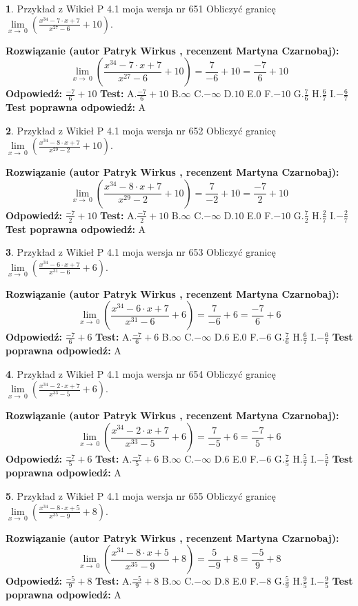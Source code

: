 \documentclass[12pt, a4paper]{article}
\theoremstyle{definition} %
\newtheorem{zad}{}
\newcommand{\zadStart}[1]{\begin{zad}#1\newline}
\newcommand{\zadStop}{\end{zad}}
\newcommand{\rozwStart}[2]{\noindent \textbf{Rozwiązanie (autor #1 , recenzent #2): }\newline}
\newcommand{\rozwStop}{\newline}
\newcommand{\odpStart}{\noindent \textbf{Odpowiedź:}\newline}
\newcommand{\odpStop}{\newline}
\newcommand{\testStart}{\noindent \textbf{Test:}\newline}
\newcommand{\testStop}{\newline}
\newcommand{\kluczStart}{\noindent \textbf{Test poprawna odpowiedź:}\newline}
\newcommand{\kluczStop}{\newline}
\begin{document}
\zadStart{Przykład z Wikieł P 4.1 moja wersja nr 651}
Obliczyć granicę $\lim\limits_{x\to\ 0}(\frac{x^{34}-7 \cdot x +7}{x^{27}-6}+10)$.
\zadStop
\rozwStart{Patryk Wirkus}{Martyna Czarnobaj}
$$\lim\limits_{x\to\ 0}(\frac{x^{34}-7 \cdot x +7}{x^{27}-6}+10)=\frac{7}{-6}+10=\frac{-7}{6}+10$$
\rozwStop
\odpStart
$\frac{-7}{6}+10$
\odpStop
\testStart
A.$\frac{-7}{6}+10$
B.$\infty$
C.$-\infty$
D.$10$
E.$0$
F.$-10$
G.$\frac{7}{6}$
H.$\frac{6}{7}$
I.$-\frac{6}{7}$
\testStop
\kluczStart
A
\kluczStop



\zadStart{Przykład z Wikieł P 4.1 moja wersja nr 652}
Obliczyć granicę $\lim\limits_{x\to\ 0}(\frac{x^{34}-8 \cdot x +7}{x^{29}-2}+10)$.
\zadStop
\rozwStart{Patryk Wirkus}{Martyna Czarnobaj}
$$\lim\limits_{x\to\ 0}(\frac{x^{34}-8 \cdot x +7}{x^{29}-2}+10)=\frac{7}{-2}+10=\frac{-7}{2}+10$$
\rozwStop
\odpStart
$\frac{-7}{2}+10$
\odpStop
\testStart
A.$\frac{-7}{2}+10$
B.$\infty$
C.$-\infty$
D.$10$
E.$0$
F.$-10$
G.$\frac{7}{2}$
H.$\frac{2}{7}$
I.$-\frac{2}{7}$
\testStop
\kluczStart
A
\kluczStop



\zadStart{Przykład z Wikieł P 4.1 moja wersja nr 653}
Obliczyć granicę $\lim\limits_{x\to\ 0}(\frac{x^{34}-6 \cdot x +7}{x^{31}-6}+6)$.
\zadStop
\rozwStart{Patryk Wirkus}{Martyna Czarnobaj}
$$\lim\limits_{x\to\ 0}(\frac{x^{34}-6 \cdot x +7}{x^{31}-6}+6)=\frac{7}{-6}+6=\frac{-7}{6}+6$$
\rozwStop
\odpStart
$\frac{-7}{6}+6$
\odpStop
\testStart
A.$\frac{-7}{6}+6$
B.$\infty$
C.$-\infty$
D.$6$
E.$0$
F.$-6$
G.$\frac{7}{6}$
H.$\frac{6}{7}$
I.$-\frac{6}{7}$
\testStop
\kluczStart
A
\kluczStop



\zadStart{Przykład z Wikieł P 4.1 moja wersja nr 654}
Obliczyć granicę $\lim\limits_{x\to\ 0}(\frac{x^{34}-2 \cdot x +7}{x^{33}-5}+6)$.
\zadStop
\rozwStart{Patryk Wirkus}{Martyna Czarnobaj}
$$\lim\limits_{x\to\ 0}(\frac{x^{34}-2 \cdot x +7}{x^{33}-5}+6)=\frac{7}{-5}+6=\frac{-7}{5}+6$$
\rozwStop
\odpStart
$\frac{-7}{5}+6$
\odpStop
\testStart
A.$\frac{-7}{5}+6$
B.$\infty$
C.$-\infty$
D.$6$
E.$0$
F.$-6$
G.$\frac{7}{5}$
H.$\frac{5}{7}$
I.$-\frac{5}{7}$
\testStop
\kluczStart
A
\kluczStop



\zadStart{Przykład z Wikieł P 4.1 moja wersja nr 655}
Obliczyć granicę $\lim\limits_{x\to\ 0}(\frac{x^{34}-8 \cdot x +5}{x^{35}-9}+8)$.
\zadStop
\rozwStart{Patryk Wirkus}{Martyna Czarnobaj}
$$\lim\limits_{x\to\ 0}(\frac{x^{34}-8 \cdot x +5}{x^{35}-9}+8)=\frac{5}{-9}+8=\frac{-5}{9}+8$$
\rozwStop
\odpStart
$\frac{-5}{9}+8$
\odpStop
\testStart
A.$\frac{-5}{9}+8$
B.$\infty$
C.$-\infty$
D.$8$
E.$0$
F.$-8$
G.$\frac{5}{9}$
H.$\frac{9}{5}$
I.$-\frac{9}{5}$
\testStop
\kluczStart
A
\kluczStop
\end{document}
